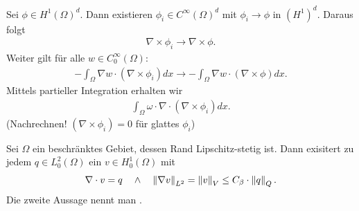 \begin{beweis}
  Sei $\phi \in H^{1}(\Omega)^{d}$. Dann existieren $\phi_{i} \in C^{\infty}(\Omega)^{d}$ mit $\phi_{i} \to \phi$ in $(H^{1})^{d}$. Daraus folgt
  \begin{align*}
    \nabla \times \phi_{i} \to \nabla \times \phi. 
  \end{align*}
Weiter gilt für alle $w \in C_{0}^{\infty}(\Omega)$:
\begin{align*}
  - \int_{\Omega} \nabla w \cdot (\nabla \times \phi_{i}) dx \to   - \int_{\Omega} \nabla w \cdot (\nabla \times \phi) dx.
\end{align*}
Mittels partieller Integration erhalten wir
\begin{align*}
  \int_{\Omega} \omega \cdot \nabla \cdot(\nabla \times \phi_{i}) dx .
\end{align*}
(Nachrechnen! $(\nabla \times \phi_{i}) = 0$ für glattes $\phi_{i}$)
\end{beweis}
\begin{satz}
  Sei $\Omega$ ein beschränktes Gebiet, dessen Rand Lipschitz-stetig ist. Dann exisitert zu jedem $q \in L_{0}^{2}(\Omega)$ ein $v \in H_{0}^{1}(\Omega)$ mit
  \begin{align*}
    \nabla \cdot v = q \quad \wedge \quad  \left \|\nabla v \right\|_{L^{2}} = \left \|v \right\|_{V} \leq C_{\beta}\cdot \left \|q \right\|_{Q}. 
  \end{align*}
Die zweite Aussage nennt man . 
\end{satz}
